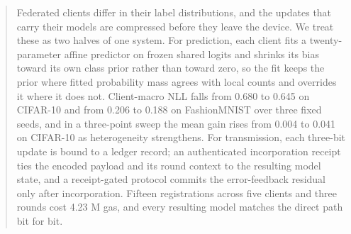 \begin{abstract}
Federated clients differ in their label distributions, and the updates that carry their models are compressed before they leave the device. We treat these as two halves of one system. For prediction, each client fits a twenty-parameter affine predictor on frozen shared logits and shrinks its bias toward its own class prior rather than toward zero, so the fit keeps the prior where fitted probability mass agrees with local counts and overrides it where it does not. Client-macro NLL falls from 0.680 to 0.645 on CIFAR-10 and from 0.206 to 0.188 on FashionMNIST over three fixed seeds, and in a three-point sweep the mean gain rises from 0.004 to 0.041 on CIFAR-10 as heterogeneity strengthens. For transmission, each three-bit update is bound to a ledger record; an authenticated incorporation receipt ties the encoded payload and its round context to the resulting model state, and a receipt-gated protocol commits the error-feedback residual only after incorporation. Fifteen registrations across five clients and three rounds cost 4.23 M gas, and every resulting model matches the direct path bit for bit.
\end{abstract}

